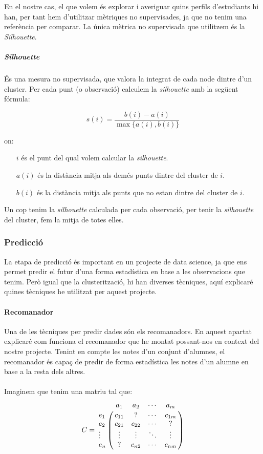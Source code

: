 \documentclass[12pt,a4paper,catalan]{article}
\begin{document}
En el nostre cas, el que volem és explorar i averiguar quins perfils d'estudiants hi han, per tant hem d'utilitzar mètriques no supervisades, ja que no tenim una referència per comparar. La única mètrica no supervisada que utilitzem és la \textit{Silhouette}.

\subparagraph{\textit{Silhouette}}
És una mesura no supervisada, que valora la integrat de cada node dintre d'un cluster. Per cada punt (o observació) calculem la \textit{silhouette} amb la següent fórmula:

$$ s(i) = \frac{b(i) - a(i)}{\max\{a(i),b(i)\}} $$

on:
\begin{itemize}[leftmargin=.5in]
	\item [$i$] és el punt del qual volem calcular la \textit{silhouette}.
	\item [$a(i)$] és la distància mitja als demés punts dintre del cluster de $i$.
	\item [$b(i)$] és la distància mitja als punts que no estan dintre del cluster de $i$.
\end{itemize}

Un cop tenim la \textit{silhouette} calculada per cada observació, per tenir la \textit{silhouette} del cluster, fem la mitja de totes elles.

\newpage

\subsubsection{Predicció}
La etapa de predicció és important en un projecte de data science, ja que ens permet predir el futur d'una forma estadística en base a les observacions que tenim. Però igual que la clusterització, hi han diverses tècniques, aquí explicaré quines tècniques he utilitzat per aquest projecte.

\paragraph{Recomanador}
Una de les tècniques per predir dades són els recomanadors. En aquest apartat explicaré com funciona el recomanador que he montat possant-nos en context del nostre projecte. Tenint en compte les notes d'un conjunt d'alumnes, el recomanador és capaç de predir de forma estadística les notes d'un alumne en base a la resta dels altres.
\\
\\
Imaginem que tenim una matriu tal que:
$$
C = \bordermatrix{~ &         a_1   &    a_2   &   \cdots    &    a_m  \cr
                  e_1    &  c_{11}  &     ?    &   \cdots    &  c_{1m} \cr
                  e_2    &  c_{21}  &  c_{22}  &   \cdots    &    ?    \cr
                  \vdots &  \vdots  &  \vdots  &   \ddots    &  \vdots \cr
                  e_n    &    ?     &  c_{n2}  &   \cdots    &  c_{nm} \cr
                  }
$$
\end{document}
